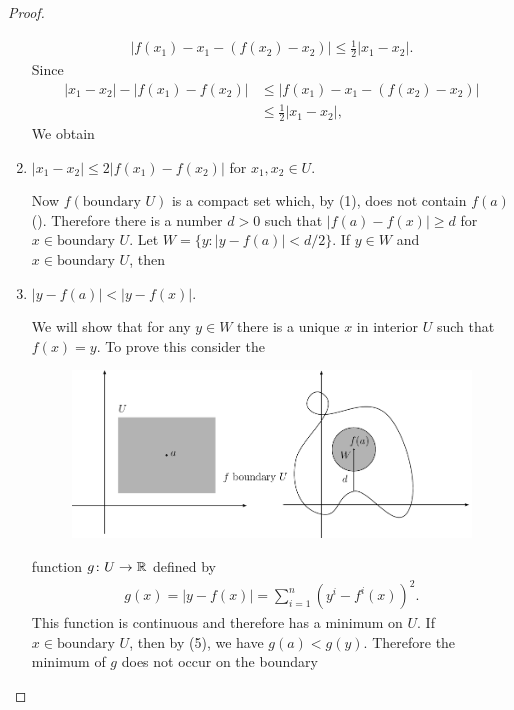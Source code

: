 \begin{proof}
\begin{enumerate}[label={\textup{\arabic*.\,}}]
\begin{align*}
                \left|f(x_1) - x_1 -\left(f(x_2) - x_2\right)\right| 
                \le \frac{1}{2}\left|x_1-x_2\right|.
            \end{align*}
            Since 
            \begin{align*}
                |x_1-x_2| - |f(x_1) - f(x_2)| 
                & \le |f(x_1) - x_1 - \left(f(x_2) - x_2\right)| \\
                & \le \frac12 |x_1 - x_2|,
            \end{align*}
            We obtain 
        \item $|x_1 - x_2|\le 2|f(x_1) - f(x_2)|$ for $x_1, x_2 \in U$.\par 
            Now $f(\text{boundary } U)$ is a compact set which, by (1), does not 
            contain $f(a)$ (). Therefore there is a number $d>0$ such that 
            $|f(a) - f(x)|\ge d$ for $x\in \text{boundary } U$. Let $W= \{y:|y-f(a)| < d/2\}$. 
            If $y\in W$ and $x\in \text{boundary } U$, then 
        \item $|y-f(a)| < |y-f(x)|$.\par 
            We will show that for any $y\in W$ there is a unique $x$ in
            interior $U$ such that $f(x) = y$. To prove this consider the
            \begin{figure}[!htb]
              \centering
              \includegraphics[width=1.45\linewidth, angle=90]{./pics/Fig2-3.pdf}
              \caption{}
              \label{Fig 2-3}
            \end{figure}
            function $g\colon{}U\to \mathbb{R}$ defined by 
            \begin{align*}
                g(x) 
                = |y-f(x)|
                = \sum_{i=1}^{n}{\left(y^i - f^i(x)\right)^2}.
            \end{align*}
            This function is continuous and therefore has a minimum on $U$. If $x\in \text{boundary } U$, then 
            by (5), we have $g(a)< g(y)$. Therefore the minimum of $g$ does not occur on the boundary 

\end{enumerate}
\end{proof}
